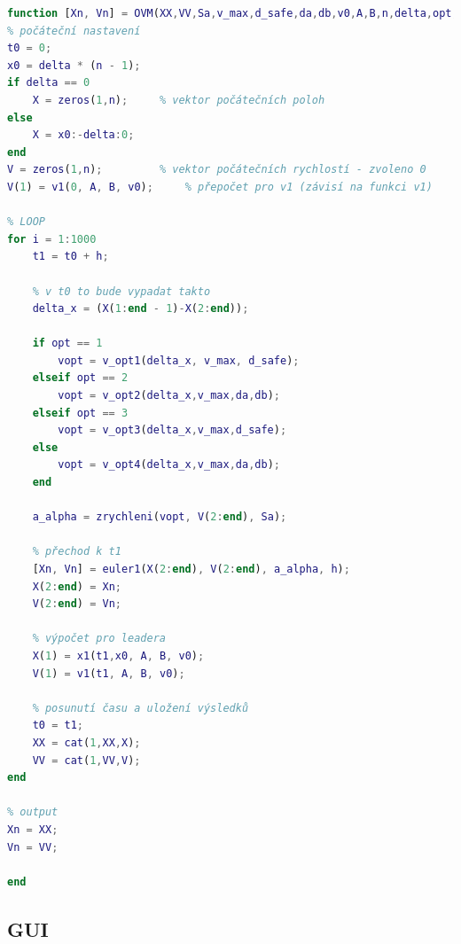 \documentclass[a4paper, 12pt, fleqn]{article}
\begin{document}
\begin{lstlisting}[language=Matlab,caption=Funkce pro provedení simulace a výpočet trajektorií.]
function [Xn, Vn] = OVM(XX,VV,Sa,v_max,d_safe,da,db,v0,A,B,n,delta,opt,volba,h)
% počáteční nastavení
t0 = 0;
x0 = delta * (n - 1);
if delta == 0
	X = zeros(1,n);		% vektor počátečních poloh
else
	X = x0:-delta:0;
end
V = zeros(1,n);			% vektor počátečních rychlostí - zvoleno 0
V(1) = v1(0, A, B, v0); 	% přepočet pro v1 (závisí na funkci v1)

% LOOP
for i = 1:1000
	t1 = t0 + h;
	
	% v t0 to bude vypadat takto
	delta_x = (X(1:end - 1)-X(2:end));
	
	if opt == 1
		vopt = v_opt1(delta_x, v_max, d_safe);
	elseif opt == 2
		vopt = v_opt2(delta_x,v_max,da,db);
	elseif opt == 3
		vopt = v_opt3(delta_x,v_max,d_safe);
	else 
		vopt = v_opt4(delta_x,v_max,da,db);
	end
	
	a_alpha = zrychleni(vopt, V(2:end), Sa);
	
	% přechod k t1
	[Xn, Vn] = euler1(X(2:end), V(2:end), a_alpha, h);
	X(2:end) = Xn;
	V(2:end) = Vn;
	
	% výpočet pro leadera
	X(1) = x1(t1,x0, A, B, v0);
	V(1) = v1(t1, A, B, v0);
	
	% posunutí času a uložení výsledků
	t0 = t1;
	XX = cat(1,XX,X);
	VV = cat(1,VV,V);
end

% output
Xn = XX;
Vn = VV;

end

\end{lstlisting}

\subsection{GUI}
\end{document}
